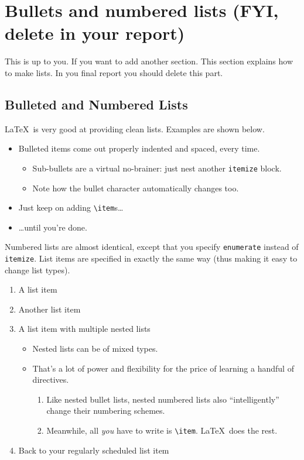 \documentclass{article}
\begin{document}
\section{Bullets and numbered lists (FYI, delete in your report)}

This is up to you. If you want to add another section. This section explains how to make lists. In you final report you should delete this part. 

\subsection{Bulleted and Numbered Lists}

\LaTeX\ is very good at providing clean lists.  Examples are shown below.

\begin{itemize}
\item Bulleted items come out properly indented and spaced, every time.

\begin{itemize}
\item Sub-bullets are a virtual no-brainer: just nest another \verb!itemize! block.
\item Note how the bullet character automatically changes too.
\end{itemize}

\item Just keep on adding \verb!\item!s\ldots

\item \ldots until you're done.
\end{itemize}

Numbered lists are almost identical, except that you specify \verb!enumerate! instead of \verb!itemize!.  List items are specified in exactly the same way (thus making it easy to change list types).

\begin{enumerate}
\item A list item
\item Another list item
\item A list item with multiple nested lists

\begin{itemize}
\item Nested lists can be of mixed types.
\item That's a lot of power and flexibility for the price of learning a handful of directives.

\begin{enumerate}
\item Like nested bullet lists, nested numbered lists also ``intelligently'' change their numbering schemes.
\item Meanwhile, all \emph{you} have to write is \verb!\item!.  \LaTeX\ does the rest.
\end{enumerate}
\end{itemize}

\item Back to your regularly scheduled list item

\end{enumerate}
\end{document}
